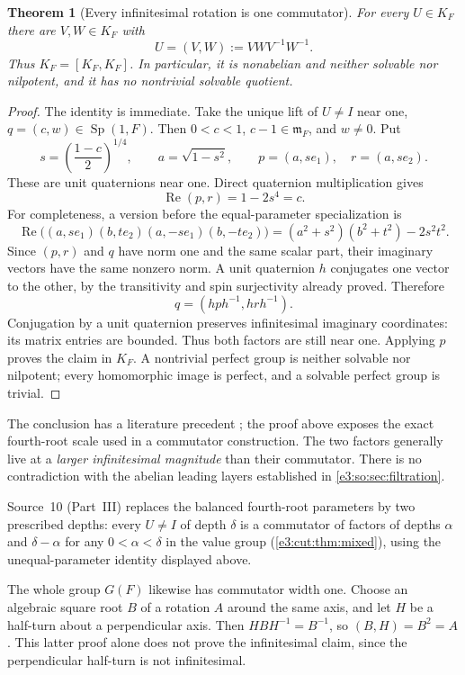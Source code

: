 \documentclass[11pt,letterpaper]{article}
\numberwithin{equation}{section}
\newtheorem{theorem}{Theorem}[section]
\theoremstyle{definition}
\theoremstyle{remark}
\newcommand{\mm}{\mathfrak m}
\newcommand{\Sp}{\operatorname{Sp}}
\newcommand{\re}{\operatorname{Re}}
\newcommand{\comm}[2]{\left(#1,#2\right)}
\begin{document}
\begin{theorem}[Every infinitesimal rotation is one commutator]\label{e3:so:thm:perfect}
For every \(U\in K_F\) there are \(V,W\in K_F\) with
\[
 U=\comm{V}{W}:=VWV^{-1}W^{-1}.
\]
Thus \(K_F=[K_F,K_F]\). In particular, it is nonabelian and neither solvable
nor nilpotent, and it has no nontrivial solvable quotient.
\end{theorem}
\begin{proof}
The identity is immediate. Take the unique lift of \(U\ne I\) near one,
\(q=(c,w)\in\Sp(1,F)\). Then \(0<c<1\), \(c-1\in\mm_F\), and \(w\ne0\).
Put
\[
 s=\left(\frac{1-c}{2}\right)^{1/4},\qquad a=\sqrt{1-s^2},
 \qquad p=(a,se_1),\quad r=(a,se_2).
\]
These are unit quaternions near one. Direct quaternion multiplication gives
\begin{equation}\label{e3:so:eq:commutatorscalar}
 \re\comm{p}{r}=1-2s^4=c.
\end{equation}
For completeness, a version before the equal-parameter specialization is
\[
 \re\bigl((a,se_1)(b,te_2)(a,-se_1)(b,-te_2)\bigr)
 =(a^2+s^2)(b^2+t^2)-2s^2t^2.
\]
Since \(\comm{p}{r}\) and \(q\) have norm one and the same scalar part, their
imaginary vectors have the same nonzero norm. A unit quaternion \(h\) conjugates
one vector to the other, by the transitivity and spin surjectivity already
proved. Therefore
\[
 q=\comm{hph^{-1}}{hrh^{-1}}.
\]
Conjugation by a unit quaternion preserves infinitesimal imaginary coordinates:
its matrix entries are bounded. Thus both factors are still near one. Applying
\(p\) proves the claim in \(K_F\). A nontrivial perfect group is neither
solvable nor nilpotent; every homomorphic image is perfect, and a solvable perfect
group is trivial.
\end{proof}

The conclusion has a literature precedent \cite[proof of Claim 3.3]{BP}; the
proof above exposes the exact fourth-root scale used in a commutator
construction. The two factors generally live at a \emph{larger infinitesimal
magnitude} than their commutator. There is no contradiction with the abelian
leading layers established in \cref{e3:so:sec:filtration}.

Source~10 (Part~III) replaces the balanced fourth-root parameters by two
prescribed depths: every $U\ne I$ of depth $\delta$ is a commutator of factors of
depths $\alpha$ and $\delta-\alpha$ for any $0<\alpha<\delta$ in the value group
(\cref{e3:cut:thm:mixed}), using the unequal-parameter identity displayed above.

The whole group \(G(F)\) likewise has commutator width one. Choose an algebraic
square root \(B\) of a rotation \(A\) around the same axis, and let \(H\) be a
half-turn about a perpendicular axis. Then \(HBH^{-1}=B^{-1}\), so
\(\comm{B}{H}=B^2=A\). This latter proof alone does not prove the infinitesimal
claim, since the perpendicular half-turn is not infinitesimal.
\end{document}
